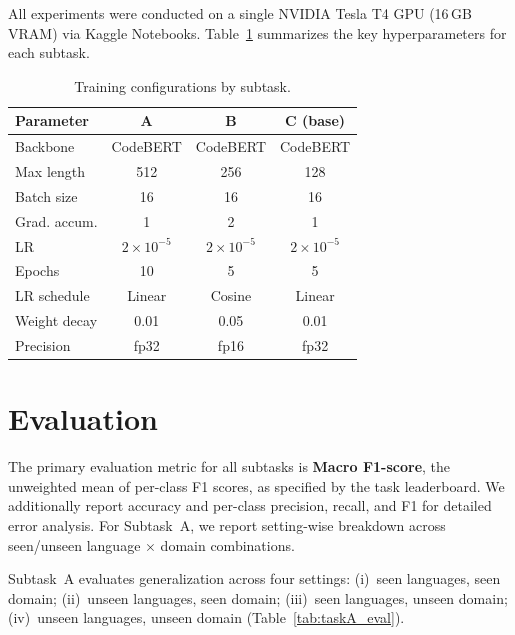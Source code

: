 \documentclass[11pt]{article}
\begin{document}
All experiments were conducted on a single NVIDIA Tesla T4 GPU (16\,GB VRAM) via Kaggle Notebooks. Table~\ref{tab:training_config} summarizes the key hyperparameters for each subtask.

\begin{table}[ht]
\centering
\footnotesize
\begin{tabularx}{\columnwidth}{@{}l c c c@{}}
\toprule
\textbf{Parameter} & \textbf{A} & \textbf{B} & \textbf{C (base)} \\ \midrule
Backbone & CodeBERT & CodeBERT & CodeBERT \\
Max length & 512 & 256 & 128 \\
Batch size & 16 & 16 & 16 \\
Grad. accum. & 1 & 2 & 1 \\
LR & $2{\times}10^{-5}$ & $2{\times}10^{-5}$ & $2{\times}10^{-5}$ \\
Epochs & 10 & 5 & 5 \\
LR schedule & Linear & Cosine & Linear \\
Weight decay & 0.01 & 0.05 & 0.01 \\
Precision & fp32 & fp16 & fp32 \\
\bottomrule
\end{tabularx}
\caption{Training configurations by subtask.}
\label{tab:training_config}
\end{table}

\section{Evaluation}
\label{sec:metrics}

The primary evaluation metric for all subtasks is \textbf{Macro F1-score}, the unweighted mean of per-class F1 scores, as specified by the task leaderboard. We additionally report accuracy and per-class precision, recall, and F1 for detailed error analysis. For Subtask~A, we report setting-wise breakdown across seen/unseen language $\times$ domain combinations.

Subtask~A evaluates generalization across four settings: (i)~seen languages, seen domain; (ii)~unseen languages, seen domain; (iii)~seen languages, unseen domain; (iv)~unseen languages, unseen domain (Table~\ref{tab:taskA_eval}).
\end{document}
